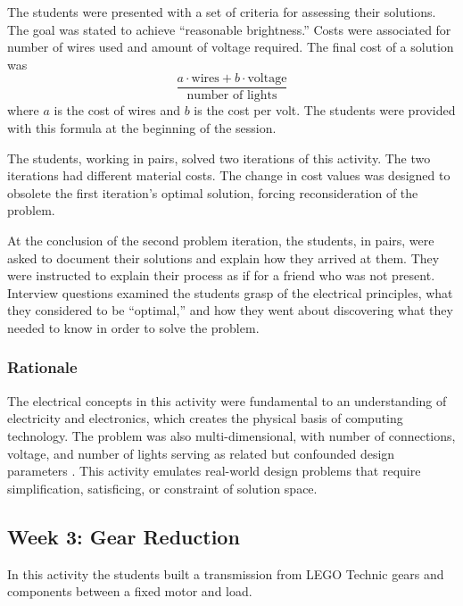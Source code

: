 	The students were presented with a set of criteria for assessing their solutions. The goal was stated to achieve ``reasonable brightness.'' Costs were associated for number of wires used and amount of voltage required. The final cost of a solution was \[
	\frac{a \cdot \text{wires} + b \cdot \text{voltage}}{\text{number of lights}}\]
	where $a$ is the cost of wires and $b$ is the cost per volt. The students were provided with this formula at the beginning of the session.
	
	The students, working in pairs, solved two iterations of this
	activity. The two iterations had different material costs. The
	change in cost values was designed to obsolete the first iteration's
	optimal solution, forcing reconsideration of the problem.
	
	At the conclusion of the second problem iteration, the students, in
	pairs, were asked to document their solutions and explain how they
	arrived at them. They were instructed to explain their process
	as if for a friend who was not present. Interview questions examined
	the students grasp of the electrical principles, what they considered
	to be {}``optimal,'' and how they went about discovering what they
	needed to know in order to solve the problem.
	
	
	\subsubsection{Rationale}
	
	The electrical concepts in this activity were fundamental to an understanding
	of electricity and electronics, which creates the physical basis of computing
	technology. The problem was also multi-dimensional, with number of
	connections, voltage, and number of lights serving as related but confounded design parameters \citep{axiomatic}. This activity emulates real-world design problems that require simplification,
	satisficing, or constraint of solution space.

\subsection{Week 3: Gear Reduction}

	In this activity the students built a transmission from LEGO
	Technic gears and components between a fixed motor and load. 
	

